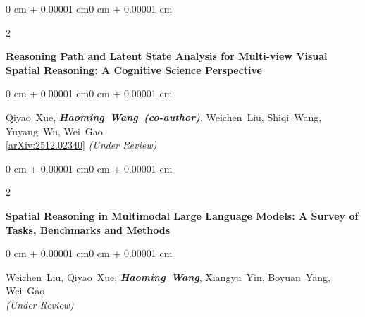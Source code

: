 \documentclass[10pt, letterpaper]{article}
\newenvironment{onecolentry}{
    \begin{adjustwidth}{0 cm + 0.00001 cm}{0 cm + 0.00001 cm}
}{
    \end{adjustwidth}
}
\newenvironment{twocolentry}[2][]{
    \onecolentry
    \def\secondColumn{#2}
    \setcolumnwidth{\fill, 4.5 cm}
    \begin{paracol}{2}
}{
    \switchcolumn \raggedleft \secondColumn
    \end{paracol}
    \endonecolentry
}
\let\hrefWithoutArrow\href
\begin{document}
\begin{samepage}
            \vspace{0.3 cm}

            \begin{twocolentry}{
                2026
            }
                \textbf{Reasoning Path and Latent State Analysis for Multi-view Visual Spatial Reasoning: A Cognitive Science Perspective}
            \end{twocolentry}
            \vspace{0.10 cm}
            \begin{onecolentry}
                \mbox{Qiyao Xue}, \mbox{\textbf{\textit{Haoming Wang (co-author)}}}, \mbox{Weichen Liu}, \mbox{Shiqi Wang}, \mbox{Yuyang Wu}, \mbox{Wei Gao}
                \vspace{0.10 cm}
                \\ \hrefWithoutArrow{https://arxiv.org/abs/2512.02340}{[arXiv:2512.02340]} \textit{(Under Review)}
            \end{onecolentry}

            \vspace{0.3 cm}

            \begin{twocolentry}{
                2024
            }
                \textbf{Spatial Reasoning in Multimodal Large Language Models: A Survey of Tasks, Benchmarks and Methods}
            \end{twocolentry}
            \vspace{0.10 cm}
            \begin{onecolentry}
                \mbox{Weichen Liu}, \mbox{Qiyao Xue}, \mbox{\textbf{\textit{Haoming Wang}}}, \mbox{Xiangyu Yin}, \mbox{Boyuan Yang}, \mbox{Wei Gao}
                \vspace{0.10 cm}
                \\ \textit{(Under Review)}
            \end{onecolentry}

        \end{samepage}
\end{document}
